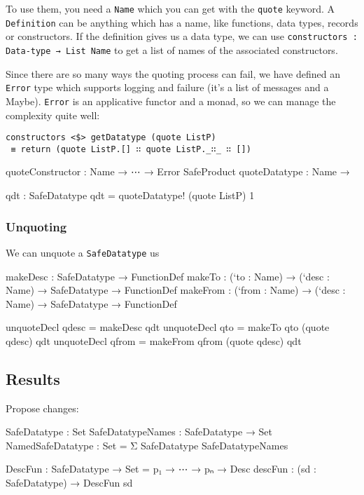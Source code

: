To use them, you need a \texttt{Name} which you can get with the
\texttt{quote} keyword.
A \texttt{Definition} can be anything which has a name, like
functions, data types, records or constructors.
If the definition gives us a data type, we can use 
\texttt{constructors : Data-type → List Name} to get a list of names
of the associated constructors.

Since there are so many ways the quoting process can fail, we have
defined an \texttt{Error} type which supports
logging and failure (it's a list of messages and a Maybe).
\texttt{Error} is an applicative functor and a monad, so we can manage
the complexity quite well:

\begin{verbatim}
constructors <$> getDatatype (quote ListP)
 ≡ return (quote ListP.[] ∷ quote ListP._∷_ ∷ [])
\end{verbatim}



quoteConstructor : Name → ⋯ → Error SafeProduct
quoteDatatype : Name → 

qdt : SafeDatatype
qdt = quoteDatatype! (quote ListP) 1

\subsubsection{Unquoting}

We can unquote a \texttt{SafeDatatype} us

makeDesc : SafeDatatype → FunctionDef
makeTo : (`to : Name) → (`desc : Name) → SafeDatatype → FunctionDef
makeFrom : (`from : Name) → (`desc : Name) → SafeDatatype → FunctionDef

unquoteDecl qdesc = makeDesc qdt
unquoteDecl qto = makeTo qto (quote qdesc) qdt
unquoteDecl qfrom = makeFrom qfrom (quote qdesc) qdt

\subsection{Results}\label{sec:prototype-results}

Propose changes:

SafeDatatype : Set
SafeDatatypeNames : SafeDatatype → Set
NamedSafeDatatype : Set = Σ SafeDatatype SafeDatatypeNames

DescFun : SafeDatatype → Set = p₁ → ⋯ → pₙ → Desc
descFun : (sd : SafeDatatype) → DescFun sd

